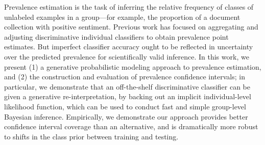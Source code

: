 Prevalence estimation is the task of inferring the relative frequency of classes of unlabeled examples in a group---for example, the proportion of a document collection with positive sentiment. Previous work has focused on aggregating and adjusting discriminative individual classifiers to obtain prevalence point estimates. But imperfect classifier accuracy ought to be reflected in uncertainty over the predicted prevalence for scientifically valid inference. In this work, we present (1) a generative probabilistic modeling approach to prevalence estimation, and (2) the construction and evaluation of prevalence confidence intervals; in particular, we demonstrate that an off-the-shelf discriminative classifier can be given a generative re-interpretation, by backing out an implicit individual-level likelihood function, which can be used to conduct fast and simple group-level Bayesian inference. Empirically, we demonstrate our approach provides better confidence interval coverage than an alternative, and is dramatically more robust to shifts in the class prior between training and testing.
